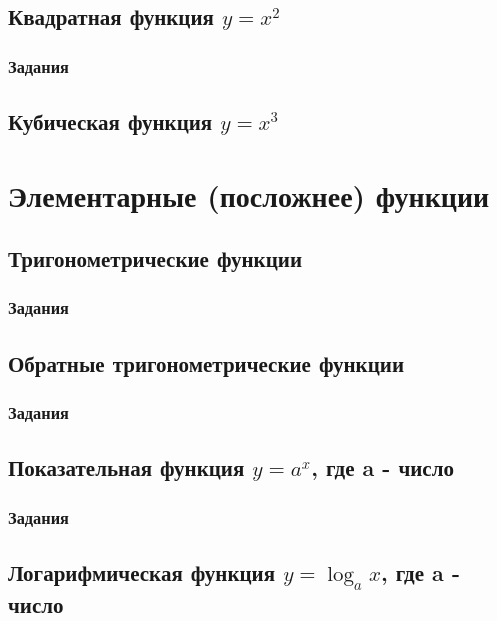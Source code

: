 \documentclass[12pt,a4paper]{scrartcl}
\begin{document}
\subsection{Квадратная функция $y=x^2$}


\subsubsection{Задания}

\newpage

\subsection{Кубическая функция $y=x^3$}


\newpage
\section{Элементарные (посложнее) функции}
\subsection{Тригонометрические функции}


\subsubsection{Задания}


\newpage

\subsection{Обратные тригонометрические функции}


\newpage
\subsubsection{Задания}


\newpage
\subsection{Показательная функция $y = a^x$, где a - число}


\subsubsection{Задания}


\newpage
\subsection{Логарифмическая функция $y = \log_a{x}$, где a - число}

\end{document}
